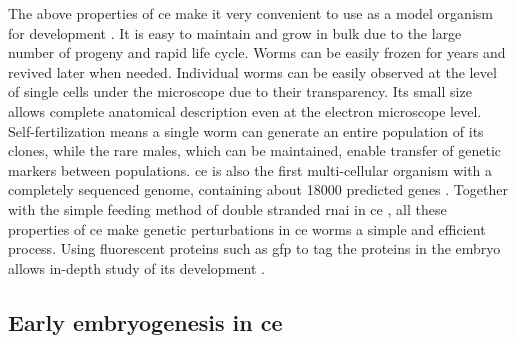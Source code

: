 The above properties of \ac{ce} make it very convenient to use as a model organism for development \citep{corsi2015transparent,brenner1974genetics}. It is easy to maintain and grow in bulk due to the large number of progeny and rapid life cycle. Worms can be easily frozen for years and revived later when needed. Individual worms can be easily observed at the level of single cells under the microscope due to their transparency. Its small size allows complete anatomical description even at the electron microscope level. Self-fertilization means a single worm can generate an entire population of its clones, while the rare males, which can be maintained, enable transfer of genetic markers between populations. \ac{ce} is also the first multi-cellular organism with a completely sequenced genome, containing about 18000 predicted genes \citep{c1998genome}. Together with the simple feeding method of double stranded \ac{rnai} in \ac{ce} \citep{kamath2003genome}, all these properties of \ac{ce} make genetic perturbations in \ac{ce} worms a simple and efficient process. Using fluorescent proteins such as \ac{gfp} to tag the proteins in the embryo allows in-depth study of its development \citep{chalfie1994green,boulin2006reporter}.

\subsection{Early embryogenesis in \acs{ce}}\label{subsec:EarlyEmbryoCelegans}

